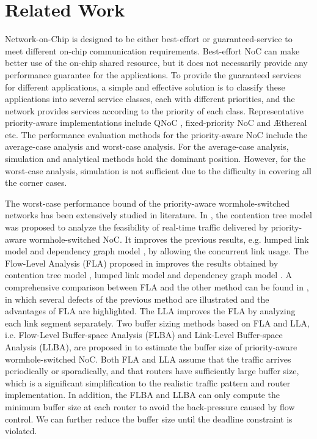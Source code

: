 \documentclass[preprint]{elsarticle}
\begin{document}
\section{Related Work}\label{related}
Network-on-Chip is designed to be either best-effort or guaranteed-service to meet different on-chip communication requirements. Best-effort NoC can make better use of the on-chip shared resource, but it does not necessarily provide any performance guarantee for the applications. To provide the guaranteed services for different applications, a simple and effective solution is to classify these applications into several service classes, each with different priorities, and the network provides services according to the priority of each class. Representative priority-aware implementations include QNoC \cite{BCGK04}, fixed-priority NoC \cite{Shi:2008:RCA:1397757.1397996} and {{\AE}thereal} \cite{GoDR05} etc. The performance evaluation methods for the priority-aware NoC include the average-case analysis and worst-case analysis. For the average-case analysis, simulation and analytical methods hold the dominant position. However, for the worst-case analysis, simulation is not sufficient due to the difficulty in covering all the corner cases.

The worst-case performance bound of the priority-aware wormhole-switched networks has been extensively studied in literature. In \cite{LuJS05}, the contention tree model was proposed to analyze the feasibility of real-time traffic delivered by priority-aware wormhole-switched NoC. It improves the previous results, e.g. lumped link model \cite{707545} and dependency graph model \cite{708526}, by allowing the concurrent link usage. The Flow-Level Analysis (FLA) proposed in \cite{Shi:2008:RCA:1397757.1397996} improves the results obtained by contention tree model \cite{LuJS05}, lumped link model \cite{707545} and dependency graph model \cite{708526}. A comprehensive comparison between FLA and the other method can be found in \cite{Shi2009}, in which several defects of the previous method are illustrated and the advantages of FLA are highlighted. The LLA \cite{73} improves the FLA by analyzing each link segment separately. Two buffer sizing methods based on FLA and LLA, i.e. Flow-Level Buffer-space Analysis (FLBA) and Link-Level Buffer-space Analysis (LLBA), are proposed in \cite{189} to estimate the buffer size of priority-aware wormhole-switched NoC. Both FLA and LLA assume that the traffic arrives periodically or sporadically, and that routers have sufficiently large buffer size, which is a significant simplification to the realistic traffic pattern and router implementation. In addition, the FLBA and LLBA can only compute the minimum buffer size at each router to avoid the back-pressure caused by flow control. We can further reduce the buffer size until the deadline constraint is violated.
\end{document}
